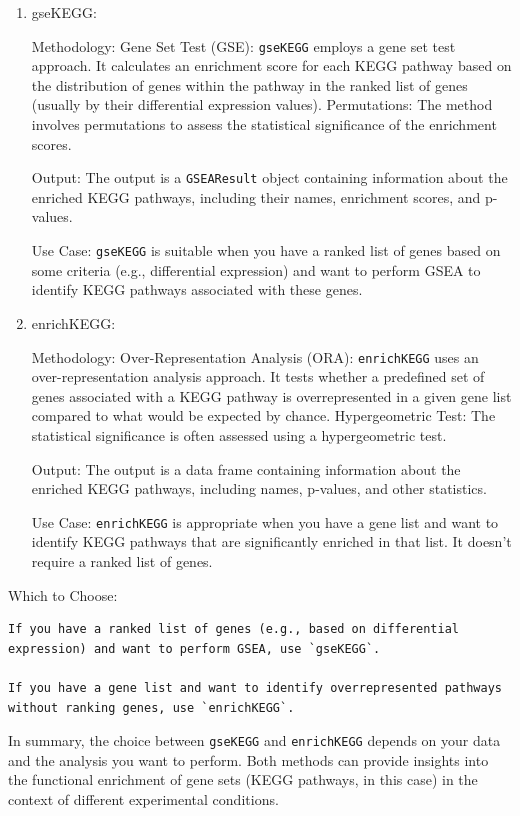 \documentclass[
]{book}
\begin{document}
\begin{enumerate}
\def\labelenumi{\arabic{enumi}.}
\item
  gseKEGG:

  Methodology:
  Gene Set Test (GSE): \texttt{gseKEGG} employs a gene set test approach. It calculates an enrichment score for each KEGG pathway based on the distribution of genes within the pathway in the ranked list of genes (usually by their differential expression values).
  Permutations: The method involves permutations to assess the statistical significance of the enrichment scores.

  Output:
  The output is a \texttt{GSEAResult} object containing information about the enriched KEGG pathways, including their names, enrichment scores, and p-values.

  Use Case:
  \texttt{gseKEGG} is suitable when you have a ranked list of genes based on some criteria (e.g., differential expression) and want to perform GSEA to identify KEGG pathways associated with these genes.
\item
  enrichKEGG:

  Methodology:
  Over-Representation Analysis (ORA): \texttt{enrichKEGG} uses an over-representation analysis approach. It tests whether a predefined set of genes associated with a KEGG pathway is overrepresented in a given gene list compared to what would be expected by chance.
  Hypergeometric Test: The statistical significance is often assessed using a hypergeometric test.

  Output:
  The output is a data frame containing information about the enriched KEGG pathways, including names, p-values, and other statistics.

  Use Case:
  \texttt{enrichKEGG} is appropriate when you have a gene list and want to identify KEGG pathways that are significantly enriched in that list. It doesn't require a ranked list of genes.
\end{enumerate}

Which to Choose:

\begin{verbatim}
If you have a ranked list of genes (e.g., based on differential expression) and want to perform GSEA, use `gseKEGG`.

If you have a gene list and want to identify overrepresented pathways without ranking genes, use `enrichKEGG`.
\end{verbatim}

In summary, the choice between \texttt{gseKEGG} and \texttt{enrichKEGG} depends on your data and the analysis you want to perform. Both methods can provide insights into the functional enrichment of gene sets (KEGG pathways, in this case) in the context of different experimental conditions.
\end{document}
